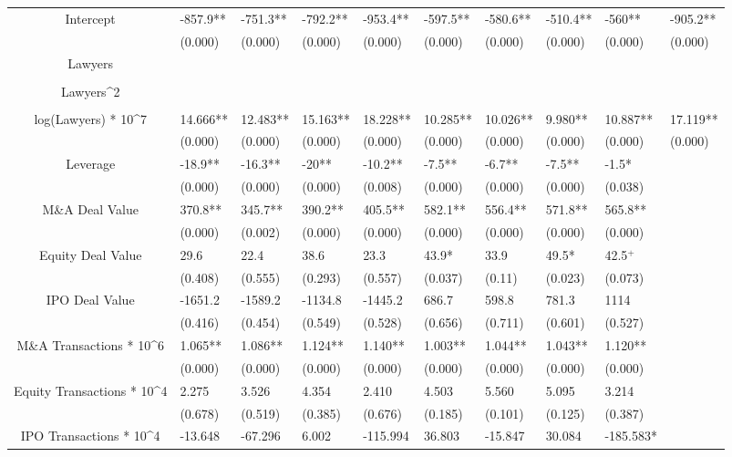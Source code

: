 \documentclass{article}
\begin{document}
\begin{table}[H]
\begin{tabular}{|clllllllll|}
Intercept & -857.9** & -751.3** & -792.2** & -953.4** & -597.5** & -580.6** & -510.4** & -560** & -905.2** \\ 
   & (0.000) & (0.000) & (0.000) & (0.000) & (0.000) & (0.000) & (0.000) & (0.000) & (0.000) \\ 
  Lawyers &  &  &  &  &  &  &  &  &  \\ 
   &  &  &  &  &  &  &  &  &  \\ 
  Lawyers^2 &  &  &  &  &  &  &  &  &  \\ 
   &  &  &  &  &  &  &  &  &  \\ 
  log(Lawyers) * 10^7 & 14.666** & 12.483** & 15.163** & 18.228** & 10.285** & 10.026** & 9.980** & 10.887** & 17.119** \\ 
   & (0.000) & (0.000) & (0.000) & (0.000) & (0.000) & (0.000) & (0.000) & (0.000) & (0.000) \\ 
  Leverage & -18.9** & -16.3** & -20** & -10.2** & -7.5** & -6.7** & -7.5** & -1.5* &  \\ 
   & (0.000) & (0.000) & (0.000) & (0.008) & (0.000) & (0.000) & (0.000) & (0.038) &  \\ 
  M\&A Deal Value & 370.8** & 345.7** & 390.2** & 405.5** & 582.1** & 556.4** & 571.8** & 565.8** &  \\ 
   & (0.000) & (0.002) & (0.000) & (0.000) & (0.000) & (0.000) & (0.000) & (0.000) &  \\ 
  Equity Deal Value & 29.6 & 22.4 & 38.6 & 23.3 & 43.9* & 33.9 & 49.5* & 42.5$^{+}$ &  \\ 
   & (0.408) & (0.555) & (0.293) & (0.557) & (0.037) & (0.11) & (0.023) & (0.073) &  \\ 
  IPO Deal Value & -1651.2 & -1589.2 & -1134.8 & -1445.2 & 686.7 & 598.8 & 781.3 & 1114 &  \\ 
   & (0.416) & (0.454) & (0.549) & (0.528) & (0.656) & (0.711) & (0.601) & (0.527) &  \\ 
  M\&A Transactions * 10^6 & 1.065** & 1.086** & 1.124** & 1.140** & 1.003** & 1.044** & 1.043** & 1.120** &  \\ 
   & (0.000) & (0.000) & (0.000) & (0.000) & (0.000) & (0.000) & (0.000) & (0.000) &  \\ 
  Equity Transactions * 10^4 & 2.275 & 3.526 & 4.354 & 2.410 & 4.503 & 5.560 & 5.095 & 3.214 &  \\ 
   & (0.678) & (0.519) & (0.385) & (0.676) & (0.185) & (0.101) & (0.125) & (0.387) &  \\ 
  IPO Transactions * 10^4 & -13.648 & -67.296 & 6.002 & -115.994 & 36.803 & -15.847 & 30.084 & -185.583* &  \\ 

\end{tabular}
\end{table}
\end{document}
